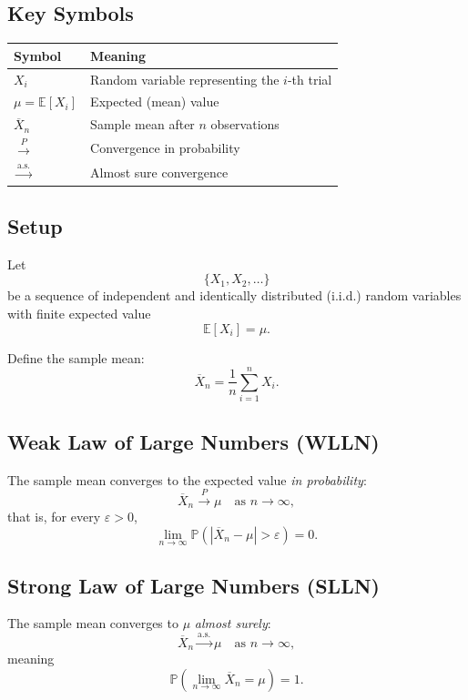 \subsection{Key Symbols}

\begin{center}
\begin{tabular}{ll}
\toprule
\textbf{Symbol} & \textbf{Meaning} \\
\midrule
$X_i$ & Random variable representing the $i$-th trial \\
$\mu = \mathbb{E}[X_i]$ & Expected (mean) value \\
$\overline{X}_n$ & Sample mean after $n$ observations \\
$\xrightarrow{P}$ & Convergence in probability \\
$\xrightarrow{\text{a.s.}}$ & Almost sure convergence \\
\bottomrule
\end{tabular}
\end{center}

\subsection{Setup}

Let
\[
\{X_1, X_2, \dots\}
\]
be a sequence of independent and identically distributed (i.i.d.) random variables with finite expected value
\[
\mathbb{E}[X_i] = \mu.
\]

Define the sample mean:
\[
\overline{X}_n = \frac{1}{n} \sum_{i=1}^{n} X_i.
\]

\subsection{Weak Law of Large Numbers (WLLN)}

The sample mean converges to the expected value \emph{in probability}:
\[
\overline{X}_n \xrightarrow{P} \mu \quad \text{as } n \to \infty,
\]
that is, for every $\varepsilon > 0$,
\[
\lim_{n \to \infty} \mathbb{P}(|\overline{X}_n - \mu| > \varepsilon) = 0.
\]

\subsection{Strong Law of Large Numbers (SLLN)}

The sample mean converges to $\mu$ \emph{almost surely}:
\[
\overline{X}_n \xrightarrow{\text{a.s.}} \mu \quad \text{as } n \to \infty,
\]
meaning
\[
\mathbb{P}\left( \lim_{n \to \infty} \overline{X}_n = \mu \right) = 1.
\]

